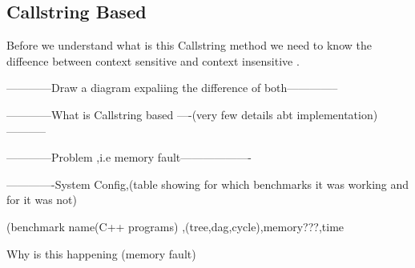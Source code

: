 \documentclass[11pt]{article}
\begin{document}
\subsection{Callstring Based}
    Before we understand what is this Callstring method we need to know the diffeence between context sensitive and context insensitive .

    ------------Draw a diagram expaliing the difference of both--------------

    ------------What is Callstring based ----(very few details abt implementation)-----------

    ------------Problem ,i.e memory fault-------------------

   -------------System Config,(table showing for which benchmarks it was working and for it was not)

                (benchmark name(C++ programs) ,(tree,dag,cycle),memory???,time

  Why is this happening (memory fault)





\end{document}

